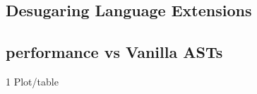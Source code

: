 \subsection{Desugaring Language Extensions}



\subsection{\name performance vs Vanilla ASTs}

1 Plot/table

